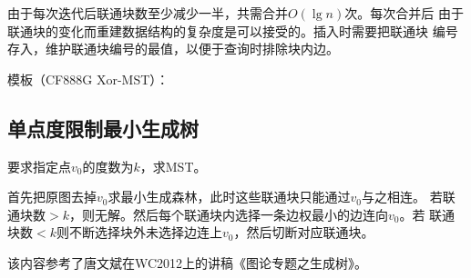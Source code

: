 由于每次迭代后联通块数至少减少一半，共需合并$O(\lg n)$次。每次合并后
由于联通块的变化而重建数据结构的复杂度是可以接受的。插入时需要把联通块
编号存入，维护联通块编号的最值，以便于查询时排除块内边。

模板（CF888G Xor-MST）：

\subsection{单点度限制最小生成树}
要求指定点$v_0$的度数为$k$，求MST。

首先把原图去掉$v_0$求最小生成森林，此时这些联通块只能通过$v_0$与之相连。
若联通块数$>k$，则无解。然后每个联通块内选择一条边权最小的边连向$v_0$。若
联通块数$<k$则不断选择块外未选择边连上$v_0$，然后切断对应联通块。

该内容参考了唐文斌在WC2012上的讲稿《图论专题之生成树》。
